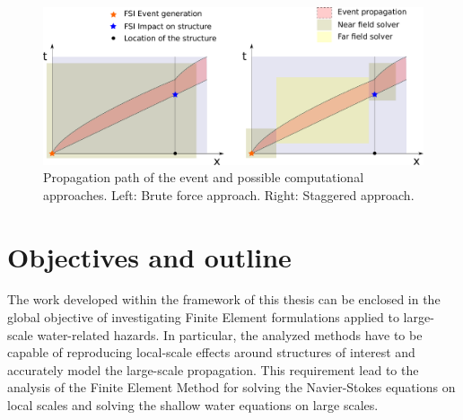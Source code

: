 \begin{figure}
    \centering
    \includegraphics[width=\textwidth]{img/coupling/space_time}
    \caption{Propagation path of the event and possible computational approaches. Left: Brute force approach. Right: Staggered approach.}
    \label{space_time_staggered_approach}
\end{figure}











\section{Objectives and outline}


The work developed within the framework of this thesis can be enclosed in the global objective of investigating Finite Element formulations applied to large-scale water-related hazards. In particular, the analyzed methods have to be capable of reproducing local-scale effects around structures of interest and accurately model the large-scale propagation. This requirement lead to the analysis of the Finite Element Method for solving the Navier-Stokes equations on local scales and solving the shallow water equations on large scales.

